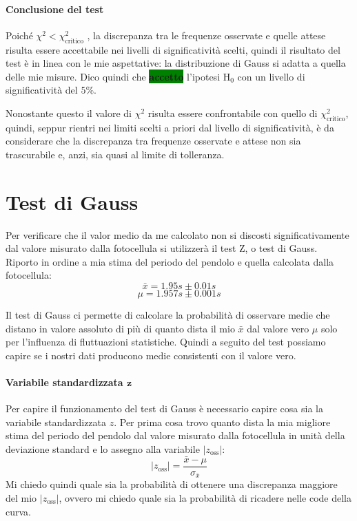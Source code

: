 \documentclass{article}
\begin{document}
	\paragraph{Conclusione del test} Poiché $\chi^2 < \chi^2_{\text{critico}}$ , la  discrepanza tra le frequenze osservate e quelle attese risulta essere accettabile nei livelli di significatività scelti, quindi il risultato del test è in linea con le mie aspettative: la distribuzione di Gauss si adatta a quella delle mie misure. Dico quindi che \colorbox{green}{\textbf{accetto}} l'ipotesi $\text{H}_{0}$ con un livello di significatività del $5\%$. 
	
	Nonostante questo il valore di $\chi^2$ risulta essere confrontabile con quello di $\chi^2_{\text{critico}}$, quindi, seppur rientri nei limiti scelti a priori dal livello di significatività, è da considerare che la discrepanza tra frequenze osservate e attese non sia trascurabile e, anzi, sia quasi al limite di tolleranza.
	
	
	\vspace{1cm}
	\section{Test di Gauss}
	Per verificare che il valor medio da me calcolato non si discosti significativamente dal valore misurato dalla fotocellula si utilizzerà il test Z, o test di Gauss. Riporto in ordine a mia stima del periodo del pendolo e quella calcolata dalla fotocellula:
	\[
	\bar{x} = 1.95s \pm 0.01 s
	\]
	\[
	\mu = 1.957s \pm 0.001 s
	\]

	Il test di Gauss ci permette di calcolare la probabilità di osservare medie che distano in valore assoluto di più di quanto dista il mio $\bar{x}$ dal valore vero $\mu$ solo per l'influenza di fluttuazioni statistiche. Quindi a seguito del test possiamo capire se i nostri dati producono medie consistenti con il valore vero.\\
	
		\paragraph{Variabile standardizzata $\mathbf{z}$} Per capire il funzionamento del test di Gauss è necessario capire cosa sia la variabile standardizzata $z$. Per prima cosa trovo quanto dista la mia migliore stima del periodo del pendolo dal valore misurato dalla fotocellula in  unità della deviazione standard e lo assegno alla variabile $|z_{\text{oss}}|$:
	\[
	|z_{\text{oss}}| = \frac{\bar{x} - \mu}{\sigma_{\bar{x}}}
	\]
	Mi chiedo quindi quale sia la probabilità di ottenere una discrepanza maggiore del mio $|z_{\text{oss}}|$, ovvero mi chiedo quale sia la probabilità di ricadere nelle code della curva.
	
\end{document}
